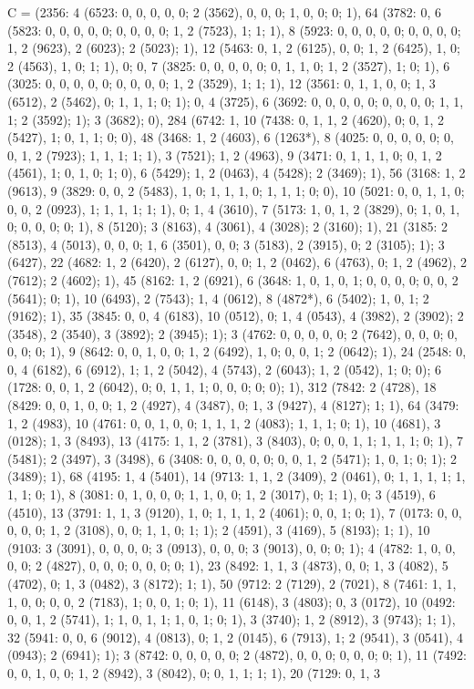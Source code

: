 {C = (2356: 4 (6523: 0, 0, 0, 0, 0; 2 (3562), 0, 0, 0; 1, 0, 0; 0; 1), 64 (3782: 0, 6 (5823: 0, 0, 0, 0, 0; 0, 0, 0, 0; 1, 2 (7523), 1; 1; 1), 8 (5923: 0, 0, 0, 0, 0; 0, 0, 0, 0; 1, 2 (9623), 2 (6023); 2 (5023); 1), 12 (5463: 0, 1, 2 (6125), 0, 0; 1, 2 (6425), 1, 0; 2 (4563), 1, 0; 1; 1), 0; 0, 7 (3825: 0, 0, 0, 0, 0; 0, 1, 1, 0; 1, 2 (3527), 1; 0; 1), 6 (3025: 0, 0, 0, 0, 0; 0, 0, 0, 0; 1, 2 (3529), 1; 1; 1), 12 (3561: 0, 1, 1, 0, 0; 1, 3 (6512), 2 (5462), 0; 1, 1, 1; 0; 1); 0, 4 (3725), 6 (3692: 0, 0, 0, 0, 0; 0, 0, 0, 0; 1, 1, 1; 2 (3592); 1); 3 (3682); 0), 284 (6742: 1, 10 (7438: 0, 1, 1, 2 (4620), 0; 0, 1, 2 (5427), 1; 0, 1, 1; 0; 0), 48 (3468: 1, 2 (4603), 6 (1263*), 8 (4025: 0, 0, 0, 0, 0; 0, 0, 1, 2 (7923); 1, 1, 1; 1; 1), 3 (7521); 1, 2 (4963), 9 (3471: 0, 1, 1, 1, 0; 0, 1, 2 (4561), 1; 0, 1, 0; 1; 0), 6 (5429); 1, 2 (0463), 4 (5428); 2 (3469); 1), 56 (3168: 1, 2 (9613), 9 (3829: 0, 0, 2 (5483), 1, 0; 1, 1, 1, 0; 1, 1, 1; 0; 0), 10 (5021: 0, 0, 1, 1, 0; 0, 0, 2 (0923), 1; 1, 1, 1; 1; 1), 0; 1, 4 (3610), 7 (5173: 1, 0, 1, 2 (3829), 0; 1, 0, 1, 0; 0, 0, 0; 0; 1), 8 (5120); 3 (8163), 4 (3061), 4 (3028); 2 (3160); 1), 21 (3185: 2 (8513), 4 (5013), 0, 0, 0; 1, 6 (3501), 0, 0; 3 (5183), 2 (3915), 0; 2 (3105); 1); 3 (6427), 22 (4682: 1, 2 (6420), 2 (6127), 0, 0; 1, 2 (0462), 6 (4763), 0; 1, 2 (4962), 2 (7612); 2 (4602); 1), 45 (8162: 1, 2 (6921), 6 (3648: 1, 0, 1, 0, 1; 0, 0, 0, 0; 0, 0, 2 (5641); 0; 1), 10 (6493), 2 (7543); 1, 4 (0612), 8 (4872*), 6 (5402); 1, 0, 1; 2 (9162); 1), 35 (3845: 0, 0, 4 (6183), 10 (0512), 0; 1, 4 (0543), 4 (3982), 2 (3902); 2 (3548), 2 (3540), 3 (3892); 2 (3945); 1); 3 (4762: 0, 0, 0, 0, 0; 2 (7642), 0, 0, 0; 0, 0, 0; 0; 1), 9 (8642: 0, 0, 1, 0, 0; 1, 2 (6492), 1, 0; 0, 0, 1; 2 (0642); 1), 24 (2548: 0, 0, 4 (6182), 6 (6912), 1; 1, 2 (5042), 4 (5743), 2 (6043); 1, 2 (0542), 1; 0; 0); 6 (1728: 0, 0, 1, 2 (6042), 0; 0, 1, 1, 1; 0, 0, 0; 0; 0); 1), 312 (7842: 2 (4728), 18 (8429: 0, 0, 1, 0, 0; 1, 2 (4927), 4 (3487), 0; 1, 3 (9427), 4 (8127); 1; 1), 64 (3479: 1, 2 (4983), 10 (4761: 0, 0, 1, 0, 0; 1, 1, 1, 2 (4083); 1, 1, 1; 0; 1), 10 (4681), 3 (0128); 1, 3 (8493), 13 (4175: 1, 1, 2 (3781), 3 (8403), 0; 0, 0, 1, 1; 1, 1, 1; 0; 1), 7 (5481); 2 (3497), 3 (3498), 6 (3408: 0, 0, 0, 0, 0; 0, 0, 1, 2 (5471); 1, 0, 1; 0; 1); 2 (3489); 1), 68 (4195: 1, 4 (5401), 14 (9713: 1, 1, 2 (3409), 2 (0461), 0; 1, 1, 1, 1; 1, 1, 1; 0; 1), 8 (3081: 0, 1, 0, 0, 0; 1, 1, 0, 0; 1, 2 (3017), 0; 1; 1), 0; 3 (4519), 6 (4510), 13 (3791: 1, 1, 3 (9120), 1, 0; 1, 1, 1, 2 (4061); 0, 0, 1; 0; 1), 7 (0173: 0, 0, 0, 0, 0; 1, 2 (3108), 0, 0; 1, 1, 0; 1; 1); 2 (4591), 3 (4169), 5 (8193); 1; 1), 10 (9103: 3 (3091), 0, 0, 0, 0; 3 (0913), 0, 0, 0; 3 (9013), 0, 0; 0; 1); 4 (4782: 1, 0, 0, 0, 0; 2 (4827), 0, 0, 0; 0, 0, 0; 0; 1), 23 (8492: 1, 1, 3 (4873), 0, 0; 1, 3 (4082), 5 (4702), 0; 1, 3 (0482), 3 (8172); 1; 1), 50 (9712: 2 (7129), 2 (7021), 8 (7461: 1, 1, 1, 0, 0; 0, 0, 2 (7183), 1; 0, 0, 1; 0; 1), 11 (6148), 3 (4803); 0, 3 (0172), 10 (0492: 0, 0, 1, 2 (5741), 1; 1, 0, 1, 1; 1, 0, 1; 0; 1), 3 (3740); 1, 2 (8912), 3 (9743); 1; 1), 32 (5941: 0, 0, 6 (9012), 4 (0813), 0; 1, 2 (0145), 6 (7913), 1; 2 (9541), 3 (0541), 4 (0943); 2 (6941); 1); 3 (8742: 0, 0, 0, 0, 0; 2 (4872), 0, 0, 0; 0, 0, 0; 0; 1), 11 (7492: 0, 0, 1, 0, 0; 1, 2 (8942), 3 (8042), 0; 0, 1, 1; 1; 1), 20 (7129: 0, 1, 3 }
